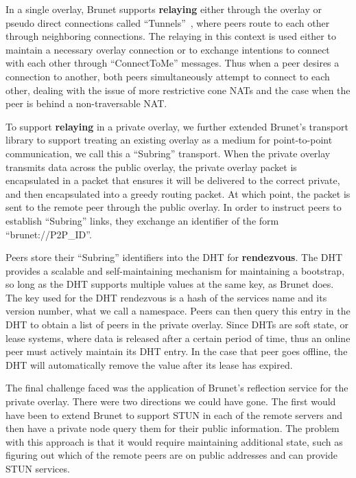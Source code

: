 \documentclass[conference]{IEEEtran}
\begin{document}
In a single overlay, Brunet supports \textbf{relaying} either through the
overlay or pseudo direct connections called ``Tunnels''~\cite{hpdc08_0}, where
peers route to each other through neighboring connections.  The relaying in
this context is used either to maintain a necessary overlay connection or to
exchange intentions to connect with each other through ``ConnectToMe''
messages.  Thus when a peer desires a connection to another, both peers
simultaneously attempt to connect to each other, dealing with the issue of more
restrictive cone NATs and the case when the peer is behind a non-traversable
NAT.  

To support \textbf{relaying} in a private overlay, we further extended Brunet's
transport library to support treating an existing overlay as a medium for
point-to-point communication, we call this a ``Subring'' transport.  When the
private overlay transmits data across the public overlay, the private overlay
packet is encapsulated in a packet that ensures it will be delivered to the
correct private, and then encapsulated into a greedy routing packet.  At which
point, the packet is sent to the remote peer through the public overlay.  In
order to instruct peers to establish ``Subring'' links, they exchange an
identifier of the form ``brunet://P2P\_ID''.

Peers store their ``Subring'' identifiers into the DHT for \textbf{rendezvous}.
The DHT provides a scalable and self-maintaining mechanism for maintaining a
bootstrap, so long as the DHT supports multiple values at the same key, as
Brunet does.  The key used for the DHT rendezvous is a hash of the services
name and its version number, what we call a namespace.  Peers can then query
this entry in the DHT to obtain a list of peers in the private overlay.  Since
DHTs are soft state, or lease systems, where data is released after a certain
period of time, thus an online peer must actively maintain its DHT entry.  In
the case that peer goes offline, the DHT will automatically remove the value
after its lease has expired.

The final challenge faced was the application of Brunet's reflection service
for the private overlay.  There were two directions we could have gone.  The
first would have been to extend Brunet to support STUN in each of the remote
servers and then have a private node query them for their public information.
The problem with this approach is that it would require maintaining additional
state, such as figuring out which of the remote peers are on public addresses
and can provide STUN services.
\end{document}

